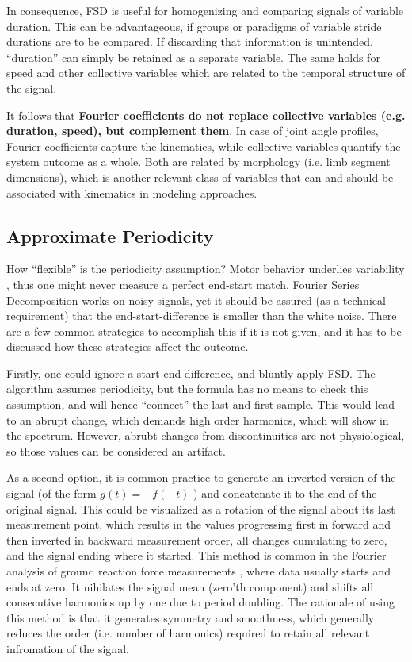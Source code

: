 \documentclass[10pt,a4paper]{article}
\begin{document}
In consequence, FSD is useful for homogenizing and comparing signals of variable duration.
This can be advantageous, if groups or paradigms of variable stride durations are to be compared.
If discarding that information is unintended, ``duration'' can simply be retained as a separate variable.
The same holds for speed and other collective variables which are related to the temporal structure of the signal.

It follows that \textbf{Fourier coefficients do not replace collective variables (e.g. duration, speed), but complement them}.
In case of joint angle profiles, Fourier coefficients capture the kinematics, while collective variables quantify the system outcome as a whole.
Both are related by morphology (i.e. limb segment dimensions), which is another relevant class of variables that can and should be associated with kinematics in modeling approaches.


\subsection{Approximate Periodicity}
\label{properties:endstart}
How ``flexible'' is the periodicity assumption?
Motor behavior underlies variability \citep{Bernstein1935}, thus one might never measure a perfect end-start match.
Fourier Series Decomposition works on noisy signals, yet it should be assured (as a technical requirement) that the end-start-difference is smaller than the white noise.
There are a few common strategies to accomplish this if it is not given, and it has to be discussed how these strategies affect the outcome.



Firstly, one could ignore a start-end-difference, and bluntly apply FSD.
The algorithm assumes periodicity, but the formula has no means to check this assumption, and will hence ``connect'' the last and first sample.
This would lead to an abrupt change, which demands high order harmonics, which will show in the spectrum.
However, abrubt changes from discontinuities are not physiological, so those values can be considered an artifact.


As a second option, it is common practice to generate an inverted version of the signal (of the form \(g(t) = -f(-t)\) ) and concatenate it to the end of the original signal.
This could be visualized as a rotation of the signal about its last measurement point, which results in the values progressing first in forward and then inverted in backward measurement order, all changes cumulating to zero, and the signal ending where it started.
This method is common in the Fourier analysis of ground reaction force measurements \citep{Schneider1983,Alexander1980}, where data usually starts and ends at zero.
It nihilates the signal mean (zero'th component) and shifts all consecutive harmonics up by one due to period doubling.
The rationale of using this method is that it generates symmetry and smoothness, which generally reduces the order (i.e. number of harmonics) required to retain all relevant infromation of the signal.
\end{document}

